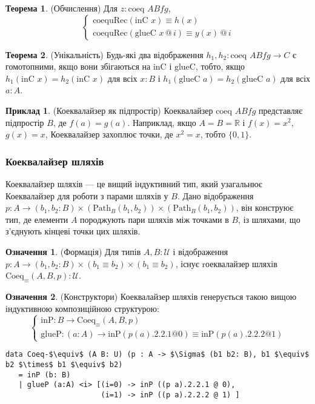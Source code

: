 \documentclass{article}
\theoremstyle{definition}
\newtheorem{theorem}{Теорема}
\newtheorem{definition}{Означення}
\newtheorem{example}{Приклад}
\begin{document}
\begin{theorem} (Обчислення)
Для \( z : \text{coeq } A B f g \),
\[
\begin{cases}
\text{coequRec}(\text{inC } x) \equiv h(x) \\
\text{coequRec}(\text{glueC } x \, @ \, i) \equiv y(x) \, @ \, i
\end{cases}
\]
\end{theorem}

\begin{theorem} (Унікальність)
Будь-які два відображення \( h_1, h_2 : \text{coeq } A B f g \to C \) є гомотопними,
якщо вони збігаються на \( \text{inC} \) і \( \text{glueC} \), тобто,
якщо \( h_1(\text{inC } x) = h_2(\text{inC } x) \) для
всіх \( x : B \) і \( h_1(\text{glueC } a) = h_2(\text{glueC } a) \) для всіх \( a : A \).
\end{theorem}

\begin{example} (Коеквалайзер як підпростір)
Коеквалайзер \( \text{coeq } A B f g \) представляє підпростір
\( B \), де \( f(a) = g(a) \). Наприклад, якщо \( A = B = \mathbb{R} \)
і \( f(x) = x^2 \), \( g(x) = x \), Коеквалайзер захоплює точки,
де \( x^2 = x \), тобто \( \{0, 1\} \).
\end{example}

\newpage
\subsubsection*{Коеквалайзер шляхів}
Коеквалайзер шляхів — це вищий індуктивний тип, який узагальнює
Коеквалайзер для роботи з парами шляхів у \( B \). Дано
відображення \( p : A \to (b_1, b_2 : B) \times (\text{Path}_B (b_1, b_2)) \times (\text{Path}_B (b_1, b_2)) \),
він конструює тип, де елементи \( A \) породжують пари
шляхів між точками в \( B \), із шляхами, що з’єднують
кінцеві точки цих шляхів.

\begin{definition} (Формація)
Для типів \( A, B : \mathcal{U} \) і відображення \( p : A \to (b_1, b_2 : B) \times (b_1 \equiv b_2) \times (b_1 \equiv b_2) \),
існує rоеквалайзер шляхів \( \text{Coeq}_\equiv(A,B,p) : \mathcal{U} \).
\end{definition}

\begin{definition} (Конструктори)
Коеквалайзер шляхів генерується такою вищою індуктивною композиційною структурою:
\[
\begin{cases}
\text{inP} : B \to \text{Coeq}_\equiv(A,B,p) \\
\text{glueP} : (a : A) \to \text{inP}(p(a).2.2.1 @ 0) \equiv \text{inP}(p(a).2.2.2 @ 1)
\end{cases}
\]
\begin{lstlisting}[mathescape=true]
data Coeq-$\equiv$ (A B: U) (p : A -> $\Sigma$ (b1 b2: B), b1 $\equiv$ b2 $\times$ b1 $\equiv$ b2)
   = inP (b: B)
   | glueP (a:A) <i> [(i=0) -> inP ((p a).2.2.1 @ 0),
                      (i=1) -> inP ((p a).2.2.2 @ 1) ]
\end{lstlisting}
\end{definition}
\end{document}
